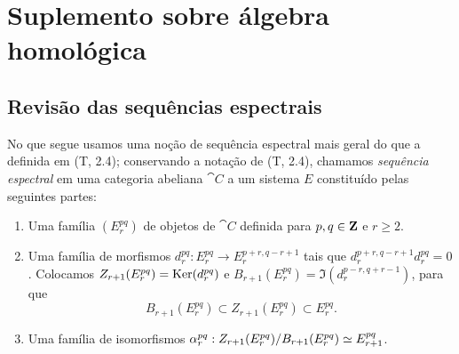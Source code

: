 \section{Suplemento sobre álgebra homológica}
\label{section:0.11}

\subsection{Revisão das sequências espectrais}
\label{subsection:0.11.1}

\begin{env}[11.1.1]
\label{0.11.1.1}
No que segue usamos uma noção de sequência espectral mais geral do que a definida em (T, 2.4); conservando a notação de (T, 2.4), chamamos \emph{sequência espectral} em uma categoria abeliana $\cat{C}$ a um sistema $E$ constituído pelas seguintes partes:
\begin{enumerate}
  \item[(a) ] Uma família $(E_r^{pq})$ de objetos de $\cat{C}$ definida para $p,q\in\mathbf{Z}$ e $r\geq 2$.
  \item[(b) ] Uma família de morfismos $d_r^{pq}:E_r^{pq}\to E_r^{p+r,q-r+1}$ tais que $d_r^{p+r,q-r+1}d_r^{pq}=0$.
    Colocamos $Z_{r+1}(E_r^{pq})=\operatorname{Ker}(d_r^{pq})$ e $B_{r+1}(E_r^{pq})=\Im(d_r^{p-r,q+r-1})$, para que
    \[
      B_{r+1}(E_r^{pq})\subset Z_{r+1}(E_r^{pq})\subset E_r^{pq}.
    \]
  \item[(c) ] Uma família de isomorfismos $\alpha_r^{pq}:Z_{r+1}(E_r^{pq})/B_{r+1}(E_r^{pq})\simeq E_{r+1}^{pq}$.


\end{enumerate}
\end{env}
